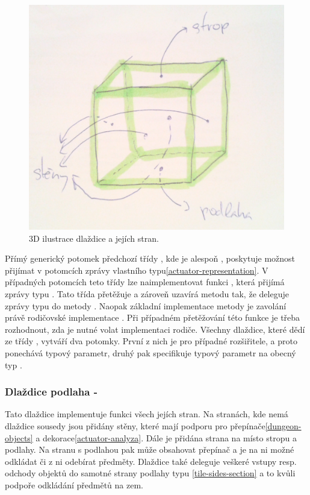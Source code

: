 \begin{figure}[H]\centering
\includegraphics[width=\textwidth]{./img/tile-sides.png}
\caption{3D ilustrace dlaždice a jejích stran. }
\label{tile-sides}
\end{figure}

Přímý generický potomek předchozí třídy , kde  je alespoň ,
poskytuje možnost přijímat v potomcích zprávy vlastního typu\vref{actuator-representation}. V případných potomcích teto třídy 
lze naimplementovat funkci , která přijímá zprávy typu . Tato třída přetěžuje a zároveň 
uzavírá metodu  tak, že deleguje zprávy typu  do metody . 
Naopak základní implementace metody  je zavolání právě rodičovské implementace . 
Při případném přetěžování této funkce je třeba rozhodnout, zda je nutné volat implementaci rodiče. Všechny dlaždice,
které dědí ze třídy , vytváří dva potomky. První z nich je pro případné rozšiřitele,
a proto ponechává typový parametr, druhý pak specifikuje typový parametr na obecný typ .

\subsubsection{Dlaždice podlaha - }
Tato dlaždice implementuje funkci všech jejích stran. Na stranách, kde
nemá dlaždice sousedy jsou přidány stěny, které mají podporu pro přepínače\vref{dungeon-objects} a dekorace\vref{actuator-analyza}.
Dále je přidána strana na místo stropu a podlahy. Na stranu s podlahou pak může obsahovat přepínač a je na ni možné odkládat
či z ni odebírat předměty. Dlaždice také deleguje veškeré vstupy resp. odchody objektů do samotné strany podlahy
typu \vref{tile-sides-section} a to kvůli podpoře odkládání předmětů na zem.

